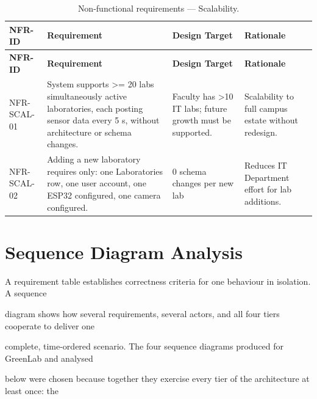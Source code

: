 \begin{longtable}{|L{2.5cm}|L{5.0cm}|L{3.2cm}|L{4.0cm}|}
	\caption{Non-functional requirements --- Scalability.} \label{tab:3-21}                                                                                                                                                                                                        \\
	\hline
	\textbf{NFR-ID} & \textbf{Requirement}                                                                                                                       & \textbf{Design Target}                                    & \textbf{Rationale}                                  \\
	\hline
	\endfirsthead
	\hline
	\textbf{NFR-ID} & \textbf{Requirement}                                                                                                                       & \textbf{Design Target}                                    & \textbf{Rationale}                                  \\
	\hline
	\endhead
	\hline
	\endfoot
	\hline
	\endlastfoot
	NFR-SCAL-01     & System supports >= 20 labs simultaneously active laboratories, each posting sensor data every 5 s, without architecture or schema changes. & Faculty has >10 IT labs; future growth must be supported. & Scalability to full campus estate without redesign. \\
	\hline
	NFR-SCAL-02     & Adding a new laboratory requires only: one Laboratories row, one user account, one ESP32 configured, one camera configured.                & 0 schema changes per new lab                              & Reduces IT Department effort for lab additions.     \\
	\hline
\end{longtable}


\section{Sequence Diagram Analysis}
A requirement table establishes correctness criteria for one behaviour in isolation. A sequence

diagram shows how several requirements, several actors, and all four tiers cooperate to deliver one

complete, time-ordered scenario. The four sequence diagrams produced for GreenLab and analysed

below were chosen because together they exercise every tier of the architecture at least once: the

